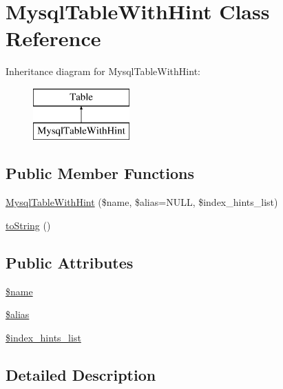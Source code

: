 \hypertarget{classMysqlTableWithHint}{\section{Mysql\+Table\+With\+Hint Class Reference}
\label{classMysqlTableWithHint}
}
Inheritance diagram for Mysql\+Table\+With\+Hint\+:\begin{figure}[H]
\begin{center}
\leavevmode
\includegraphics[height=2.000000cm]{classMysqlTableWithHint}
\end{center}
\end{figure}
\subsection*{Public Member Functions}
\begin{DoxyCompactItemize}
\item 
\hyperlink{classMysqlTableWithHint_aa77b8f9ab560a504ab1e24786f77f3a7}{Mysql\+Table\+With\+Hint} (\$name, \$alias=N\+U\+L\+L, \$index\+\_\+hints\+\_\+list)
\item 
\hyperlink{classMysqlTableWithHint_ad4123d7369e2e100a6189767d3d7e78b}{to\+String} ()
\end{DoxyCompactItemize}
\subsection*{Public Attributes}
\begin{DoxyCompactItemize}
\item 
\hyperlink{classMysqlTableWithHint_a38c6eb1620ea15d06902d2fafb991776}{\$name}
\item 
\hyperlink{classMysqlTableWithHint_a71f2f396bdbde2b55444e8f142c31816}{\$alias}
\item 
\hyperlink{classMysqlTableWithHint_ac389d7382100dd008addab6fbbbe0032}{\$index\+\_\+hints\+\_\+list}
\end{DoxyCompactItemize}


\subsection{Detailed Description}


